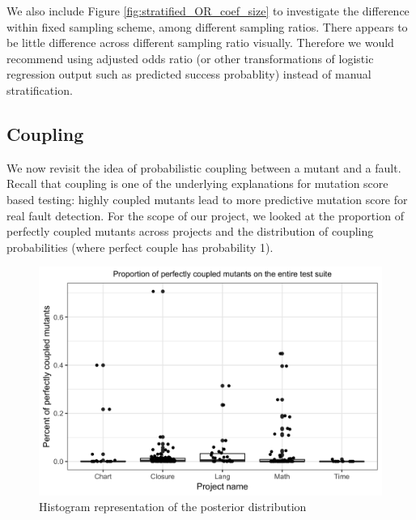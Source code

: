 \documentclass[10pt,letterpaper]{article}
\begin{document}
We also include Figure \ref{fig:stratified_OR_coef_size} to investigate the difference within fixed sampling scheme, among different sampling ratios. There appears to be little difference across different sampling ratio visually. Therefore we would recommend using adjusted odds ratio (or other transformations of logistic regression output such as predicted success probablity) instead of manual stratification.

    
\subsection{Coupling}

We now revisit the idea of probabilistic coupling between a mutant and a fault. Recall that coupling is one of the underlying explanations for mutation score based testing: highly coupled mutants lead to more predictive mutation score for real fault detection. For the scope of our project, we looked at the proportion of perfectly coupled mutants across projects and the distribution of coupling probabilities (where perfect couple has probability 1).  

  \begin{figure}[ht!]
        \centering
        \includegraphics[scale=0.1]{figures/perfect_coupling_prop_box.png}
        \caption{Histogram representation of the posterior distribution}
        \label{fig:perfect_coupling_prop_box}
    \end{figure}
    
\end{document}
